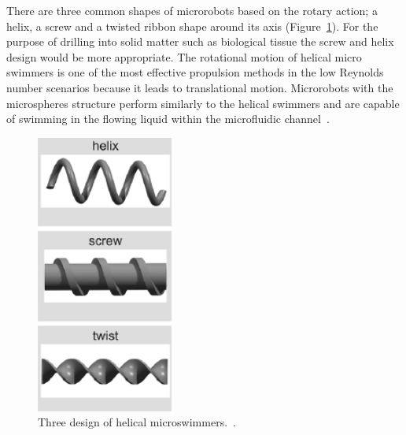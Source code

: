 \documentclass[12pt,a4paper,titlepage]{report}
\begin{document}
There are three common shapes of microrobots 
based on the rotary action; a helix, a screw and a twisted ribbon shape around its
 axis (Figure~\ref{HelixShapes}). For the purpose of drilling into solid matter such as biological tissue the screw and helix 
design would be more appropriate. The rotational motion of helical micro
 swimmers is one of the most effective propulsion methods in the low Reynolds number scenarios 
because it leads to translational motion. Microrobots with the microspheres structure perform similarly 
to the helical swimmers and are capable of swimming in the flowing liquid within the microfluidic channel~\citep{kim2013fabrication}. 


\begin{figure}
  \begin{center}
    \includegraphics[width=0.4\textwidth]{HelixShapes}
  \caption{Three design of helical microswimmers.~\citep{peyer2013magnetic}.}
  \label{HelixShapes}
  \end{center}
\end{figure}
\end{document}

